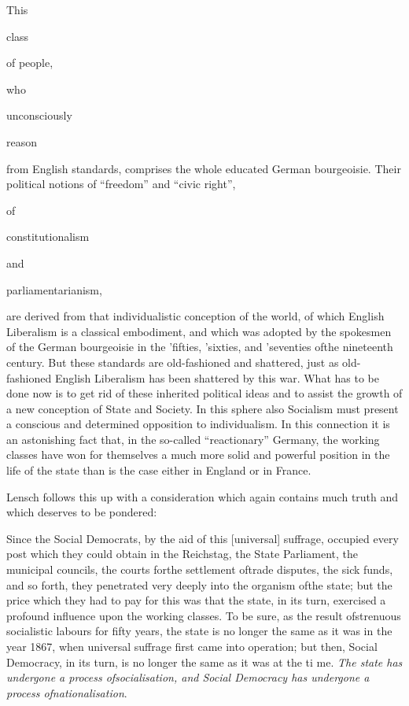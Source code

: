 \documentclass[11pt,openany]{book}
\begin{document}
This

class

of people,

who

unconsciously

reason

from English standards, comprises the whole educated German bourgeoisie. Their political notions of ``freedom'' and ``civic right'',

of

constitutionalism

and

parliamentarianism,

are derived from that individualistic conception of the world, of which English Liberalism is a classical embodiment, and which was adopted by the spokesmen of the German bourgeoisie in the 'fifties, 'sixties, and 'seventies ofthe nineteenth century. But these standards are old-fashioned and shattered, just as old-fashioned English Liberalism has been shattered by this war. What has to be done now is to get rid of these inherited political ideas and to assist the growth of a new conception of State and Society. In this sphere also Socialism must present a conscious and determined opposition to individualism. In this connection it is an astonishing fact that, in the so-called ``reactionary'' Germany, the working classes have won for themselves a much more solid and powerful position in the life of the state than is the case either in England or in France.

Lensch follows this up with a consideration which again contains much truth and which deserves to be pondered:

Since the Social Democrats, by the aid of this [universal] suffrage, occupied every post which they could obtain in the Reichstag, the State Parliament, the municipal councils, the courts forthe settlement oftrade disputes, the sick funds, and so forth, they penetrated very deeply into the organism ofthe state; but the price which they had to pay for this was that the state, in its turn, exercised a profound influence upon the working classes. To be sure, as the result ofstrenuous socialistic labours for fifty years, the state is no longer the same as it was in the year 1867, when universal suffrage first came into operation; but then, Social Democracy, in its turn, is no longer the same as it was at the ti me. \emph{The state has undergone a process ofsocialisation, and Social Democracy has undergone a process ofnationalisation}.
\end{document}
